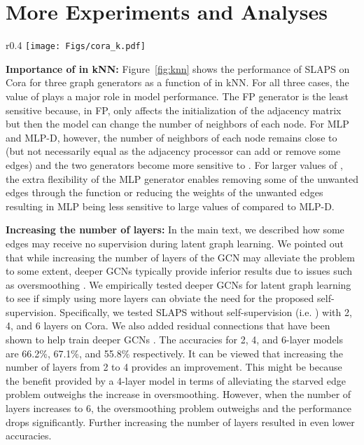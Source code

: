 \documentclass{article}
\begin{document}
\section{More Experiments and Analyses}
\begin{wrapfigure}{r}{0.4\columnwidth}
   \texttt{[image: Figs/cora\_k.pdf]}
   \caption{\label{fig:knn} The performance of SLAPS on Cora as a function of  in kNN.}
\end{wrapfigure}
\textbf{Importance of  in kNN:} Figure~\ref{fig:knn} shows the performance of SLAPS on Cora for three graph generators as a function of  in kNN. For all three cases, the value of  plays a major role in model performance. The FP generator is the least sensitive because, in FP,  only affects the initialization of the adjacency matrix but then the model can change the number of neighbors of each node.
For MLP and MLP-D, however, the number of neighbors of each node remains close to  (but not necessarily equal as the adjacency processor can add or remove some edges) and the two generators become more sensitive to . For larger values of , the extra flexibility of the MLP generator enables removing some of the unwanted edges through the function  or reducing the weights of the unwanted edges resulting in MLP being less sensitive to large values of  compared to MLP-D.

\textbf{Increasing the number of layers:} In the main text, we described how some edges may receive no supervision during latent graph learning. We pointed out that while increasing the number of layers of the GCN may alleviate the problem to some extent, deeper GCNs typically provide inferior results due to issues such as oversmoothing \citep[see, e.g.,][]{li2018deeper,oono2020graph}. We empirically tested deeper GCNs for latent graph learning to see if simply using more layers can obviate the need for the proposed self-supervision. Specifically, we tested SLAPS without self-supervision (i.e. ) with 2, 4, and 6 layers on Cora. We also added residual connections that have been shown to help train deeper GCNs \cite{li2019deepgcns}. The accuracies for 2, 4, and 6-layer models are 66.2\%, 67.1\%, and 55.8\% respectively. It can be viewed that increasing the number of layers from 2 to 4 provides an improvement. This might be because the benefit provided by a 4-layer model in terms of alleviating the starved edge problem outweighs the increase in oversmoothing. However, when the number of layers increases to 6, the oversmoothing problem outweighs and the performance drops significantly. Further increasing the number of layers resulted in even lower accuracies.
\end{document}
